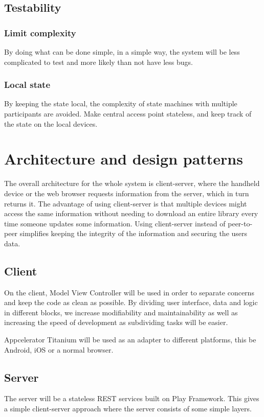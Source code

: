 \documentclass[11pt]{book}
\begin{document}
\subsection{Testability}

\subsubsection{Limit complexity}
By doing what can be done simple, in a simple way, the system will be less complicated to test and more likely than not have less bugs.

\subsubsection{Local state}
By keeping the state local, the complexity of state machines with multiple participants are avoided. Make central access point stateless, and keep track of the state on the local devices.

\section{Architecture and design patterns}

The overall architecture for the whole system is client-server, where the handheld device or the web browser requests information from the server, which in turn returns it. The advantage of using client-server is that multiple devices might access the same information without needing to download an entire library every time someone updates some information. Using client-server instead of peer-to-peer simplifies keeping the integrity of the information and securing the users data.

\subsection{Client}
On the client, Model View Controller will be used in order to separate concerns and keep the code as clean as possible. By dividing user interface, data and logic in different blocks, we increase modifiability and maintainability as well as increasing the speed of development as subdividing tasks will be easier.

Appcelerator Titanium will be used as an adapter to different platforms, this be Android, iOS or a normal browser.

\subsection{Server}
The server will be a stateless REST services built on Play Framework. This gives a simple client-server approach where the server consists of some simple layers.
\end{document}
